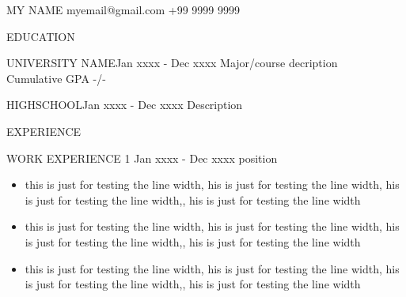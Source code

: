 \documentclass[11pt]{article}
\begin{document}
\begin{personalinfo} {MY NAME} {myemail@gmail.com} {+99 9999 9999}
\end{personalinfo}


\begin{SectionHeaders}{EDUCATION}
\end{SectionHeaders}

\begin{body1}{UNIVERSITY NAME}{Jan xxxx - Dec xxxx}
\noindent \scriptsize{Major/course decription} \\
\noindent \scriptsize {Cumulative GPA -/-}
\end{body1}


\begin{body1}{HIGHSCHOOL}{Jan xxxx - Dec xxxx}
\noindent \scriptsize{Description} 
\end{body1}


\begin{SectionHeaders}{EXPERIENCE}
\end{SectionHeaders}

\begin{body2}
{WORK EXPERIENCE 1}
{Jan xxxx - Dec xxxx}
{position}

\noindent \begin{minipage}{16cm}
\begin{itemize}[leftmargin=*]
	\item this is just for testing the line width,  his is just for testing the line width, his is just for testing the line width,, his is just for testing the line width 
	\item this is just for testing the line width,  his is just for testing the line width, his is just for testing the line width,, his is just for testing the line width 
	\item this is just for testing the line width,  his is just for testing the line width, his is just for testing the line width,, his is just for testing the line width 
\end{itemize}
\end{minipage}
\end{body2}
\end{document}
